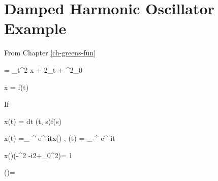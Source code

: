 \section{Damped Harmonic Oscillator Example}

From Chapter \ref{ch-greens-fun}

\beq
\call= \partial_t^2 x + 2\gamma \partial_t + \omega^2_0
\eeq

\beq
\call x = f(t)
\eeq

If 

\beq
x(t) = \int dt \chi(t, s)f(s)
\eeq


\beq
x(t) =\int_{-\infty}^{\infty}
e^{-i\omega t}x(\omega)
\;,\quad
\delta(t) =
\int_{-\infty}^{\infty}
e^{-i\omega t}
\eeq

\beq
x(\omega)(-\omega^{2} -i2\gamma\omega  +\omega_0^2)= 1
\eeq

\beq
\chi(\omega)=
\eeq

